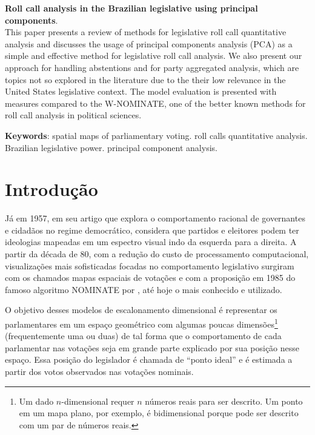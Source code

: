 \documentclass[
	article,			%
	12pt,				%
    twoside,			%
	a4paper,			%
	english,			%
	french,				%
	spanish,			%
	brazil,				%
	]{abntex2}
\newcommand\nominate{NOMINATE\xspace}
\begin{document}
\begin{resumo}[Abstract]
\noindent
\textbf{Roll call analysis in the Brazilian legislative using principal components}. \\
This paper presents a review of methods for legislative roll call quantitative analysis and discusses the usage of principal components analysis (PCA) as a simple and effective method for legislative roll call analysis. We also present our approach for handling abstentions and for party aggregated analysis, which are topics not so explored in the literature due to the their low relevance in the United States legislative context. The model evaluation is presented with measures compared to the W-NOMINATE, one of the better known methods for roll call analysis in political sciences.

\vspace{\onelineskip}

\noindent
\textbf{Keywords}: spatial maps of parliamentary voting. roll calls quantitative analysis. Brazilian legislative power. principal component analysis. 
\end{resumo}



\textual

\pagestyle{leviathan}


\section{Introdução} 

Já em 1957, em seu artigo que explora o comportamento racional de governantes e cidadãos no regime democrático,  considera que partidos e eleitores podem ter ideologias mapeadas em um espectro visual indo da esquerda para a direita. A partir da década de 80, com a redução do custo de processamento computacional, visualizações mais sofisticadas focadas no comportamento legislativo surgiram com os chamados mapas espaciais de votações e com a proposição em 1985 do famoso algoritmo \nominate por , até hoje o mais conhecido e utilizado. 

O objetivo desses modelos de escalonamento dimensional é representar os parlamentares em um espaço geométrico com algumas poucas dimensões\footnote{Um dado $n$-dimensional requer $n$ números reais para ser descrito. Um ponto em um mapa plano, por exemplo, é bidimensional porque pode ser descrito com um par de números reais.} (frequentemente uma ou duas) de tal forma que o comportamento de cada parlamentar nas votações seja em grande parte explicado por sua posição nesse espaço. Essa posição do legislador é chamada de ``ponto ideal'' e é estimada a partir dos votos observados nas votações nominais.
\end{document}
